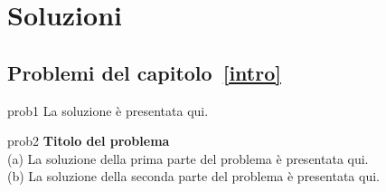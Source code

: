 \chapter*{Soluzioni}

\section*{Problemi del capitolo~\ref{intro}}

\begin{sol}{prob1}
La soluzione \`{e} presentata qui.
\end{sol}


\begin{sol}{prob2}
\textbf{Titolo del problema}\\
(a) La soluzione della prima parte del problema  \`{e} presentata qui.\\
(b) La soluzione della seconda parte del problema  \`{e} presentata qui.
\end{sol}

